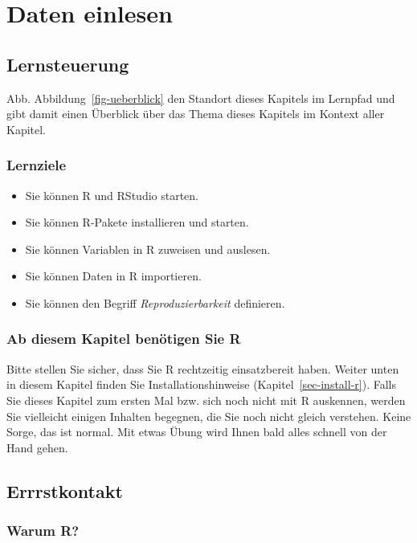 \documentclass[
  letterpaper,
]{scrbook}
\providecommand{\tightlist}{%
  \setlength{\itemsep}{0pt}\setlength{\parskip}{0pt}}\usepackage{longtable,booktabs,array}
\theoremstyle{definition}
\theoremstyle{definition}
\theoremstyle{definition}
\theoremstyle{remark}
\begin{document}
\chapter{Daten einlesen}\label{daten-einlesen}

\section{Lernsteuerung}\label{lernsteuerung-1}

Abb. Abbildung~\ref{fig-ueberblick} den Standort dieses Kapitels im
Lernpfad und gibt damit einen Überblick über das Thema dieses Kapitels
im Kontext aller Kapitel.

\subsection{Lernziele}\label{lernziele-2}

\begin{itemize}
\tightlist
\item
  Sie können R und RStudio starten.
\item
  Sie können R-Pakete installieren und starten.
\item
  Sie können Variablen in R zuweisen und auslesen.
\item
  Sie können Daten in R importieren.
\item
  Sie können den Begriff \emph{Reproduzierbarkeit} definieren.
\end{itemize}

\subsection{Ab diesem Kapitel benötigen Sie
R}\label{ab-diesem-kapitel-benuxf6tigen-sie-r}

Bitte stellen Sie sicher, dass Sie R rechtzeitig einsatzbereit haben.
Weiter unten in diesem Kapitel finden Sie Installationshinweise
(Kapitel~\ref{sec-install-r}). Falls Sie dieses Kapitel zum ersten Mal
bzw. sich noch nicht mit R auskennen, werden Sie vielleicht einigen
Inhalten begegnen, die Sie noch nicht gleich verstehen. Keine Sorge, das
ist normal. Mit etwas Übung wird Ihnen bald alles schnell von der Hand
gehen.

\section{Errrstkontakt}\label{errrstkontakt}

\subsection{Warum R?}\label{warum-r}
\end{document}
